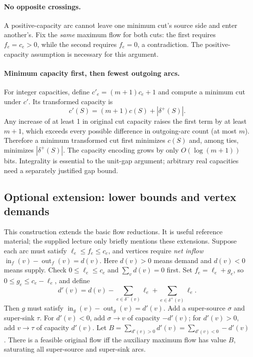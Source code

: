 \paragraph{No opposite crossings.}
A positive-capacity arc cannot leave one minimum cut's source side and enter
another's. Fix the \emph{same} maximum flow for both cuts: the first requires
$f_e=c_e>0$, while the second requires $f_e=0$, a contradiction.
The positive-capacity assumption is necessary for this argument.

\paragraph{Minimum capacity first, then fewest outgoing arcs.}
For integer capacities, define $c'_e=(m+1)c_e+1$ and compute a minimum cut
under $c'$. Its transformed capacity is
\[
 c'(S)=(m+1)c(S)+|\delta^+(S)|.
\]
Any increase of at least 1 in original cut capacity raises the first term
by at least $m+1$, which exceeds every possible difference in outgoing-arc
count (at most $m$). Therefore a minimum transformed cut first minimizes
$c(S)$ and, among ties, minimizes $|\delta^+(S)|$. The capacity encoding grows
by only $O(\log(m+1))$ bits. Integrality is essential to the unit-gap argument;
arbitrary real capacities need a separately justified gap bound.

\subsection{Optional extension: lower bounds and vertex demands}\label{nf:demands}
This construction extends the basic flow reductions. It is useful reference
material; the supplied lecture only briefly mentions these extensions.
Suppose each arc must satisfy $\ell_e\le f_e\le c_e$, and vertices require
\emph{net inflow} $\operatorname{in}_f(v)-\operatorname{out}_f(v)=d(v)$.
Here $d(v)>0$ means demand and $d(v)<0$ means supply. Check
$0\le\ell_e\le c_e$ and $\sum_v d(v)=0$ first.
Set $f_e=\ell_e+g_e$, so $0\le g_e\le c_e-\ell_e$, and define
\[
 d'(v)=d(v)-\sum_{e\in\delta^-(v)}\ell_e
                  +\sum_{e\in\delta^+(v)}\ell_e.
\]
Then $g$ must satisfy $\operatorname{in}_g(v)-\operatorname{out}_g(v)=d'(v)$.
Add a super-source $\sigma$ and super-sink $\tau$. For $d'(v)<0$, add
$\sigma\to v$ of capacity $-d'(v)$; for $d'(v)>0$, add $v\to\tau$ of
capacity $d'(v)$. Let
$B=\sum_{d'(v)>0}d'(v)=\sum_{d'(v)<0}-d'(v)$.
There is a feasible original flow iff the auxiliary maximum flow has value
$B$, saturating all super-source and super-sink arcs.

